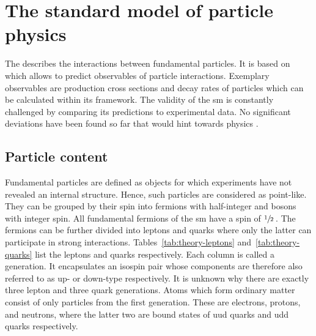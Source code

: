 \chapter{The standard model of particle physics}
\label{ch:theory}


The  describes the interactions between fundamental particles. It is based on  which allows to predict observables of particle interactions. Exemplary observables are production cross sections and decay rates of particles which can be calculated within its framework. The validity of the \gls{sm} is constantly challenged by comparing its predictions to experimental data. No significant deviations have been found so far that would hint towards physics .


\section{Particle content}

Fundamental particles are defined as objects for which experiments have not revealed an internal structure. Hence, such particles are considered as point-like. They can be grouped by their spin into fermions with half-integer and bosons with integer spin. All fundamental fermions of the \gls{sm} have a spin of $\sfrac{1}{2}\,$. The fermions can be further divided into leptons and quarks where only the latter can participate in strong interactions. Tables~\ref{tab:theory-leptons} and~\ref{tab:theory-quarks} list the leptons and quarks respectively. Each column is called a generation. It encapsulates an isospin pair whose components are therefore also referred to as up- or down-type respectively. It is unknown why there are exactly three lepton and three quark generations. Atoms which form ordinary matter consist of only particles from the first generation. These are electrons, protons, and neutrons, where the latter two are bound states of uud quarks and udd quarks respectively.

